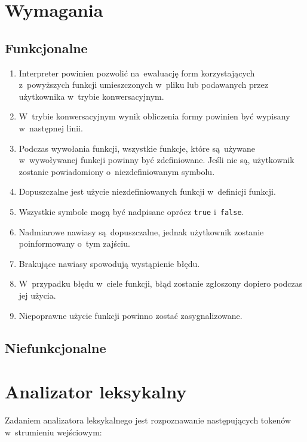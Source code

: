 \documentclass[a4paper,11pt]{article}
\begin{document}
\section{Wymagania}

\subsection{Funkcjonalne}

\begin{enumerate}
\item Interpreter powinien pozwolić na~ewaluację form korzystających
  z~powyższych funkcji umieszczonych w~pliku lub podawanych przez użytkownika
  w~trybie konwersacyjnym.
\item W~trybie konwersacyjnym wynik obliczenia formy powinien być wypisany
  w~następnej linii.
\item Podczas wywołania funkcji, wszystkie funkcje, które są~używane
  w~wywoływanej funkcji powinny być zdefiniowane. Jeśli nie są, użytkownik
  zostanie powiadomiony o~niezdefiniowanym symbolu.
\item Dopuszczalne jest użycie niezdefiniowanych funkcji w~definicji funkcji.
\item Wszystkie symbole mogą być nadpisane oprócz \verb+true+ i~\verb+false+.
\item Nadmiarowe nawiasy są~dopuszczalne, jednak użytkownik zostanie
  poinformowany o~tym zajściu.
\item Brakujące nawiasy spowodują wystąpienie błędu.
\item W~przypadku błędu w~ciele funkcji, błąd zostanie zgłoszony dopiero
  podczas jej użycia.
\item Niepoprawne użycie funkcji powinno zostać zasygnalizowane.
\end{enumerate}

\subsection{Niefunkcjonalne}

\section{Analizator leksykalny}

Zadaniem analizatora leksykalnego jest rozpoznawanie następujących tokenów
w~strumieniu wejściowym:
\end{document}
